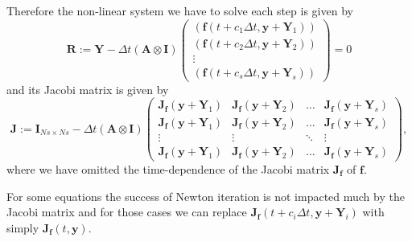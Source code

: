 \documentclass[10pt,a4paper]{article}
\newcommand{\bvec}[1]{\mathbf{#1}}
\begin{document}
Therefore the non-linear system we have to solve each step is given by
\begin{equation}
  \bvec{R} := \bvec{Y} - \Delta t (\bvec{A}\otimes\bvec{I}) \begin{pmatrix}
    (\bvec{f}(t+c_1\Delta t, \bvec{y} + \bvec{Y}_1)) \\
    (\bvec{f}(t+c_2\Delta t, \bvec{y} + \bvec{Y}_2)) \\
    \vdots \\
    (\bvec{f}(t+c_s\Delta t, \bvec{y} + \bvec{Y}_s))
  \end{pmatrix} = 0
  \label{eqn:system-solve-2}
\end{equation}
and its Jacobi matrix is given by
\begin{equation}
  \bvec{J} := \bvec{I}_{Ns\times Ns} - \Delta t (\bvec{A}\otimes\bvec{I}) \begin{pmatrix}
    \bvec{J}_\bvec{f}(\bvec{y} + \bvec{Y}_1) & \bvec{J}_\bvec{f}(\bvec{y} + \bvec{Y}_2) & \hdots & \bvec{J}_\bvec{f}(\bvec{y} + \bvec{Y}_s) \\
    \bvec{J}_\bvec{f}(\bvec{y} + \bvec{Y}_1) & \bvec{J}_\bvec{f}(\bvec{y} + \bvec{Y}_2) & \hdots & \bvec{J}_\bvec{f}(\bvec{y} + \bvec{Y}_s) \\
    \vdots & \vdots & \ddots & \vdots \\
        \bvec{J}_\bvec{f}(\bvec{y} + \bvec{Y}_1) & \bvec{J}_\bvec{f}(\bvec{y} + \bvec{Y}_2) & \hdots & \bvec{J}_\bvec{f}(\bvec{y} + \bvec{Y}_s)
  \end{pmatrix}
  \label{eqn:system-solve-3},
\end{equation}
where we have omitted the time-dependence of the Jacobi matrix $\bvec{J}_\bvec{f}$ of $\bvec{f}.$

For some equations the success of Newton iteration is not impacted much by the Jacobi matrix and for those
cases we can replace $\bvec{J}_\bvec{f}(t + c_i\Delta t, \bvec{y} + \bvec{Y}_i)$ with simply $\bvec{J}_\bvec{f}(t, \bvec{y}).$
\end{document}
